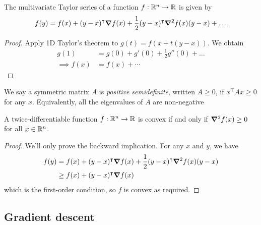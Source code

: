 \documentclass{../../template/note}
\begin{document}
    \begin{proposition}
        The multivariate Taylor series of a function $f: \mathbb R^n \to \mathbb R$ is given by
        \begin{align*}
            f(y) = f(x) + (y-x)^\intercal \grad f(x) + \frac 1 2 (y-x)^\intercal \grad^2 f(x) (y-x) + \dots
        \end{align*}
    \end{proposition}
    
    \begin{proof}
        Apply 1D Taylor's theorem to $g(t) = f(x + t(y-x))$. We obtain
        \begin{align*}
            g(1) &= g(0) + g'(0) + \frac 1 2 g''(0) + \dots \\
            \implies f(x) &= f(x) + \cdots
        \end{align*}
    \end{proof}

    \begin{definition}
        We say a symmetric matrix $A$ is \emph{positive semidefinite}, written $A \geq 0$, if $x^\intercal A x \geq 0$ for any $x$. Equivalently, all the eigenvalues of $A$ are non-negative
    \end{definition}   
    
    \begin{theorem}
        A twice-differentiable function $f: \mathbb R^n \to \mathbb R$ is convex if and only if $\grad^2 f(x) \geq 0$ for all $x \in \mathbb R^n$.
    \end{theorem}
    
    \begin{proof}
        We'll only prove the backward implication. For any $x$ and $y$, we have
        \begin{align*}
            f(y) &= f(x) + (y-x)^\intercal \grad f(x) + \frac 1 2 (y-x)^\intercal \grad^2 f(x) (y-x) \\
            &\geq f(x) + (y-x)^\intercal \grad f(x)
        \end{align*}
        which is the first-order condition, so $f$ is convex as required.        
    \end{proof}
    

    \subsection{Gradient descent}
\end{document}
